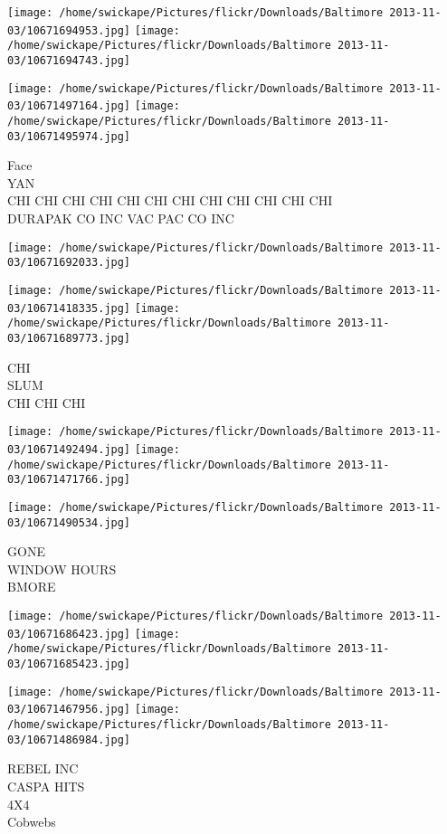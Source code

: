 \documentclass[10pt,letterpaper]{article}
\begin{document}
\texttt{[image: /home/swickape/Pictures/flickr/Downloads/Baltimore 2013-11-03/10671694953.jpg]}
\texttt{[image: /home/swickape/Pictures/flickr/Downloads/Baltimore 2013-11-03/10671694743.jpg]}

\texttt{[image: /home/swickape/Pictures/flickr/Downloads/Baltimore 2013-11-03/10671497164.jpg]}
\texttt{[image: /home/swickape/Pictures/flickr/Downloads/Baltimore 2013-11-03/10671495974.jpg]}

Face\\
YAN\\
CHI CHI CHI CHI CHI CHI CHI CHI CHI CHI CHI CHI\\
DURAPAK CO INC VAC PAC CO INC
\pagebreak

\texttt{[image: /home/swickape/Pictures/flickr/Downloads/Baltimore 2013-11-03/10671692033.jpg]}

\vspace{0.25in}
\texttt{[image: /home/swickape/Pictures/flickr/Downloads/Baltimore 2013-11-03/10671418335.jpg]}
\texttt{[image: /home/swickape/Pictures/flickr/Downloads/Baltimore 2013-11-03/10671689773.jpg]}

CHI\\
SLUM\\
CHI CHI CHI
\pagebreak

\texttt{[image: /home/swickape/Pictures/flickr/Downloads/Baltimore 2013-11-03/10671492494.jpg]}
\texttt{[image: /home/swickape/Pictures/flickr/Downloads/Baltimore 2013-11-03/10671471766.jpg]}

\vspace{0.25in}
\texttt{[image: /home/swickape/Pictures/flickr/Downloads/Baltimore 2013-11-03/10671490534.jpg]}

GONE\\
WINDOW HOURS\\
BMORE
\pagebreak

\texttt{[image: /home/swickape/Pictures/flickr/Downloads/Baltimore 2013-11-03/10671686423.jpg]}
\texttt{[image: /home/swickape/Pictures/flickr/Downloads/Baltimore 2013-11-03/10671685423.jpg]}

\texttt{[image: /home/swickape/Pictures/flickr/Downloads/Baltimore 2013-11-03/10671467956.jpg]}
\texttt{[image: /home/swickape/Pictures/flickr/Downloads/Baltimore 2013-11-03/10671486984.jpg]}

REBEL INC\\
CASPA HITS\\
4X4\\
Cobwebs
\pagebreak
\end{document}
